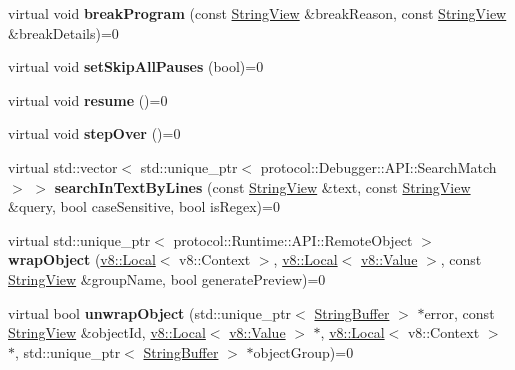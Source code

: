 \begin{DoxyCompactItemize}
virtual void {\bfseries break\+Program} (const \mbox{\hyperlink{classv8__inspector_1_1StringView}{String\+View}} \&break\+Reason, const \mbox{\hyperlink{classv8__inspector_1_1StringView}{String\+View}} \&break\+Details)=0
\item 
\mbox{\label{classv8__inspector_1_1V8InspectorSession_ae98e6ad6dd45492ce828737f7176b501}} 
virtual void {\bfseries set\+Skip\+All\+Pauses} (bool)=0
\item 
\mbox{\label{classv8__inspector_1_1V8InspectorSession_ace573efed7184ee701f06cb2543d4e15}} 
virtual void {\bfseries resume} ()=0
\item 
\mbox{\label{classv8__inspector_1_1V8InspectorSession_aa419715baf430ebac1673160251715db}} 
virtual void {\bfseries step\+Over} ()=0
\item 
\mbox{\label{classv8__inspector_1_1V8InspectorSession_acaa137f90ce833744a2a16bda60490c5}} 
virtual std\+::vector$<$ std\+::unique\+\_\+ptr$<$ protocol\+::\+Debugger\+::\+A\+P\+I\+::\+Search\+Match $>$ $>$ {\bfseries search\+In\+Text\+By\+Lines} (const \mbox{\hyperlink{classv8__inspector_1_1StringView}{String\+View}} \&text, const \mbox{\hyperlink{classv8__inspector_1_1StringView}{String\+View}} \&query, bool case\+Sensitive, bool is\+Regex)=0
\item 
\mbox{\label{classv8__inspector_1_1V8InspectorSession_a7568a840a4c681cbca9ec7ad50aba0e6}} 
virtual std\+::unique\+\_\+ptr$<$ protocol\+::\+Runtime\+::\+A\+P\+I\+::\+Remote\+Object $>$ {\bfseries wrap\+Object} (\mbox{\hyperlink{classv8_1_1Local}{v8\+::\+Local}}$<$ v8\+::\+Context $>$, \mbox{\hyperlink{classv8_1_1Local}{v8\+::\+Local}}$<$ \mbox{\hyperlink{classv8_1_1Value}{v8\+::\+Value}} $>$, const \mbox{\hyperlink{classv8__inspector_1_1StringView}{String\+View}} \&group\+Name, bool generate\+Preview)=0
\item 
\mbox{\label{classv8__inspector_1_1V8InspectorSession_adbe69bb66c76882db82482db3712b554}} 
virtual bool {\bfseries unwrap\+Object} (std\+::unique\+\_\+ptr$<$ \mbox{\hyperlink{classv8__inspector_1_1StringBuffer}{String\+Buffer}} $>$ $\ast$error, const \mbox{\hyperlink{classv8__inspector_1_1StringView}{String\+View}} \&object\+Id, \mbox{\hyperlink{classv8_1_1Local}{v8\+::\+Local}}$<$ \mbox{\hyperlink{classv8_1_1Value}{v8\+::\+Value}} $>$ $\ast$, \mbox{\hyperlink{classv8_1_1Local}{v8\+::\+Local}}$<$ v8\+::\+Context $>$ $\ast$, std\+::unique\+\_\+ptr$<$ \mbox{\hyperlink{classv8__inspector_1_1StringBuffer}{String\+Buffer}} $>$ $\ast$object\+Group)=0

\end{DoxyCompactItemize}
